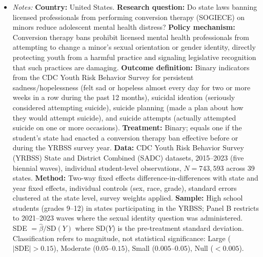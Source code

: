 \begin{table}[t]
\begin{itemize}[leftmargin=*,nosep]
\item \textit{Notes:} \textbf{Country:} United States. \textbf{Research question:} Do state laws banning licensed professionals from performing conversion therapy (SOGIECE) on minors reduce adolescent mental health distress? \textbf{Policy mechanism:} Conversion therapy bans prohibit licensed mental health professionals from attempting to change a minor's sexual orientation or gender identity, directly protecting youth from a harmful practice and signaling legislative recognition that such practices are damaging. \textbf{Outcome definition:} Binary indicators from the CDC Youth Risk Behavior Survey for persistent sadness/hopelessness (felt sad or hopeless almost every day for two or more weeks in a row during the past 12 months), suicidal ideation (seriously considered attempting suicide), suicide planning (made a plan about how they would attempt suicide), and suicide attempts (actually attempted suicide on one or more occasions). \textbf{Treatment:} Binary; equals one if the student's state had enacted a conversion therapy ban effective before or during the YRBSS survey year. \textbf{Data:} CDC Youth Risk Behavior Survey (YRBSS) State and District Combined (SADC) datasets, 2015--2023 (five biennial waves), individual student-level observations, $N = 743{,}593$ across 39 states. \textbf{Method:} Two-way fixed effects difference-in-differences with state and year fixed effects, individual controls (sex, race, grade), standard errors clustered at the state level, survey weights applied. \textbf{Sample:} High school students (grades 9--12) in states participating in the YRBSS; Panel B restricts to 2021--2023 waves where the sexual identity question was administered. SDE $= \hat{\beta} / \text{SD}(Y)$ where SD($Y$) is the pre-treatment standard deviation. Classification refers to magnitude, not statistical significance: Large ($\lvert\text{SDE}\rvert > 0.15$), Moderate ($0.05$--$0.15$), Small ($0.005$--$0.05$), Null ($< 0.005$).
\end{itemize}
\end{table}

